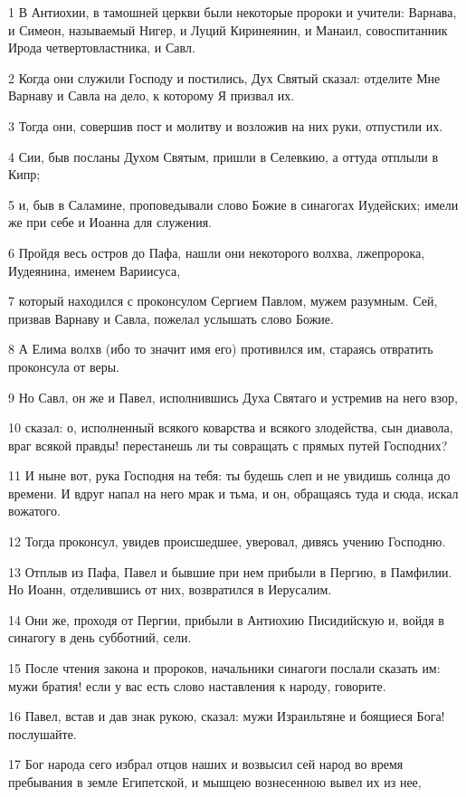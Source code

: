 \par 1 В Антиохии, в тамошней церкви были некоторые пророки и учители: Варнава, и Симеон, называемый Нигер, и Луций Киринеянин, и Манаил, совоспитанник Ирода четвертовластника, и Савл.
\par 2 Когда они служили Господу и постились, Дух Святый сказал: отделите Мне Варнаву и Савла на дело, к которому Я призвал их.
\par 3 Тогда они, совершив пост и молитву и возложив на них руки, отпустили их.
\par 4 Сии, быв посланы Духом Святым, пришли в Селевкию, а оттуда отплыли в Кипр;
\par 5 и, быв в Саламине, проповедывали слово Божие в синагогах Иудейских; имели же при себе и Иоанна для служения.
\par 6 Пройдя весь остров до Пафа, нашли они некоторого волхва, лжепророка, Иудеянина, именем Вариисуса,
\par 7 который находился с проконсулом Сергием Павлом, мужем разумным. Сей, призвав Варнаву и Савла, пожелал услышать слово Божие.
\par 8 А Елима волхв (ибо то значит имя его) противился им, стараясь отвратить проконсула от веры.
\par 9 Но Савл, он же и Павел, исполнившись Духа Святаго и устремив на него взор,
\par 10 сказал: о, исполненный всякого коварства и всякого злодейства, сын диавола, враг всякой правды! перестанешь ли ты совращать с прямых путей Господних?
\par 11 И ныне вот, рука Господня на тебя: ты будешь слеп и не увидишь солнца до времени. И вдруг напал на него мрак и тьма, и он, обращаясь туда и сюда, искал вожатого.
\par 12 Тогда проконсул, увидев происшедшее, уверовал, дивясь учению Господню.
\par 13 Отплыв из Пафа, Павел и бывшие при нем прибыли в Пергию, в Памфилии. Но Иоанн, отделившись от них, возвратился в Иерусалим.
\par 14 Они же, проходя от Пергии, прибыли в Антиохию Писидийскую и, войдя в синагогу в день субботний, сели.
\par 15 После чтения закона и пророков, начальники синагоги послали сказать им: мужи братия! если у вас есть слово наставления к народу, говорите.
\par 16 Павел, встав и дав знак рукою, сказал: мужи Израильтяне и боящиеся Бога! послушайте.
\par 17 Бог народа сего избрал отцов наших и возвысил сей народ во время пребывания в земле Египетской, и мышцею вознесенною вывел их из нее,
